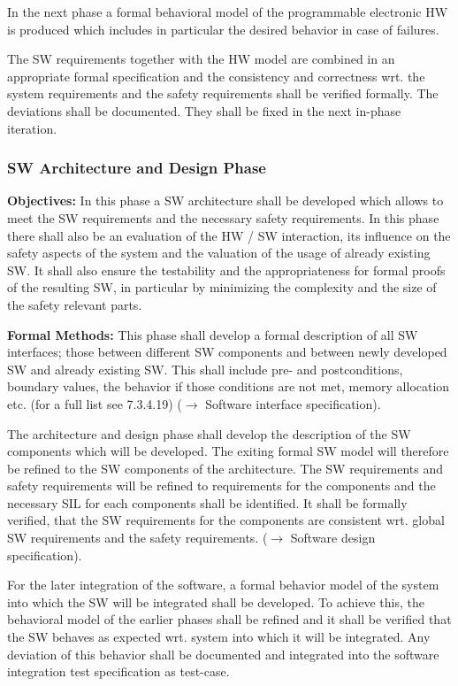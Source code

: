 In the next phase a formal behavioral model of the programmable electronic HW is
produced which includes in particular the desired behavior in case of
failures.

The SW requirements together with the HW model are combined in an appropriate
formal specification  and the consistency and correctness wrt. the system
requirements and the safety requirements shall be verified formally. The
deviations shall be documented. They shall be fixed in the next in-phase
iteration.

\subsubsection{SW Architecture and Design Phase}
\label{sec:sw-arch-design}

{\bf Objectives:} In this phase a SW architecture shall be developed which
allows to meet the SW requirements and the necessary safety requirements. In
this phase there shall also be an evaluation of the HW / SW interaction, its
influence on the safety aspects of the system and the valuation of the usage of
already existing SW. It shall also ensure the testability and the
appropriateness for formal proofs of the resulting SW, in particular by
minimizing the complexity and the size of the safety relevant parts.

{\bf Formal Methods:} This phase shall develop a formal description of all SW
interfaces; those between different SW components and between newly developed SW
and already existing SW. This shall include pre- and postconditions, boundary
values, the behavior if those conditions are not met, memory allocation
etc. (for a full list see 7.3.4.19) ($\rightarrow$ Software interface
specification).

The architecture and design phase shall develop the description of the SW
components which will be developed. The exiting formal SW model will therefore
be refined to the SW components of the architecture. The SW requirements and
safety requirements will be refined to requirements for the components and the
necessary SIL for each components shall be identified. It shall be formally
verified, that the SW requirements for the components are consistent wrt. global
SW requirements and the safety requirements. ($\rightarrow$ Software design
specification).

For the later integration of the software, a formal behavior model of the system
into which the SW will be integrated shall be developed. To achieve this, the
behavioral model of the earlier phases shall be refined and it shall be verified
that the SW behaves as expected wrt. system into which it will be
integrated. Any deviation of this behavior shall be documented and integrated
into the software integration test specification as test-case.

